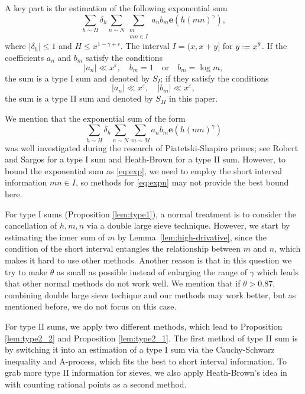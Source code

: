 \documentclass[12pt, reqno, twoside, letterpaper]{amsart}
\numberwithin{equation}{section}
\newcommand{\e}{\ensuremath{\mathbf{e}}}
\theoremstyle{customthm}
\theoremstyle{customrem}
\newcommand*{\defeq}{\mathrel{\vcenter{\baselineskip0.5ex \lineskiplimit0pt
			\hbox{\scriptsize.}\hbox{\scriptsize.}}}%
	=}
\begin{document}
A key part is the estimation of the following exponential sum
\begin{equation}
\label{eq:exp}
\sum_{h \sim H} \delta_h \sum_{n \sim N}\sum_{\substack{m \\ mn \in I}}  a_n b_m \e(h(mn)^\gamma),
\end{equation}
where $|\delta_h| \leqslant 1$ and $H \leqslant x^{1-\gamma+\epsilon}$. The interval $I = (x, x+y]$ for $y \defeq x^\theta$. If the coefficients $a_n$ and $b_m$ satisfy the conditions
$$|
a_n| \ll x^{\varepsilon}, \quad b_m = 1 \quad \text{or} \quad b_m = \log m,
$$
the sum is a type I sum and denoted by $S_I$; if they satisfy the conditions
$$|a_n| \ll x^{\varepsilon}, \quad |b_m| \ll x^{\varepsilon},$$
the sum is a type II sum and denoted by $S_{II}$ in this paper.

We mention that the exponential sum of the form
\begin{equation}
\label{eq:expn}
\sum_{h \sim H} \delta_h \sum_{n \sim N}\sum_{m \sim M}  a_n b_m \e(h(mn)^\gamma)
\end{equation}
was well investigated during the research of Piatetski-Shapiro primes; see Robert and Sargos \cite{RS2006} for a type I sum and Heath-Brown \cite{HB2} for a type II sum. However, to bound the exponential sum as \eqref{eq:exp}, we need to employ the short interval information $mn \in I$, so methods for \eqref{eq:expn} may not provide the best bound here. 
	
For type I sums (Proposition \ref{lem:type1}), a normal treatment is to consider the cancellation of $h,m,n$ via a double large sieve technique. However, we start by estimating the inner sum of $m$ by Lemma~\ref{lem:high-drivative}, since the condition of the short interval entangles the relationship between $m$ and $n$, which makes it hard to use other methods. Another reason is that in this question we try to make $\theta$ as small as possible instead of enlarging the range of $\gamma$ which leads that other normal methods do not work well. We mention that if $\theta>0.87$, combining double large sieve techique and our methods may work better, but as mentioned before, we do not focus on this case.  

For type II sums, we apply two different methods, which lead to Proposition \ref{lem:type2_2} and Proposition \ref{lem:type2_1}. The first method of type II sum is by switching it into an estimation of a type I sum via the Cauchy-Schwarz inequality and A-process, which fits the best to short interval information. To grab more type II information for sieves, we also apply Heath-Brown's idea in \cite{HB2} with counting rational points as a second method. 
\end{document}
